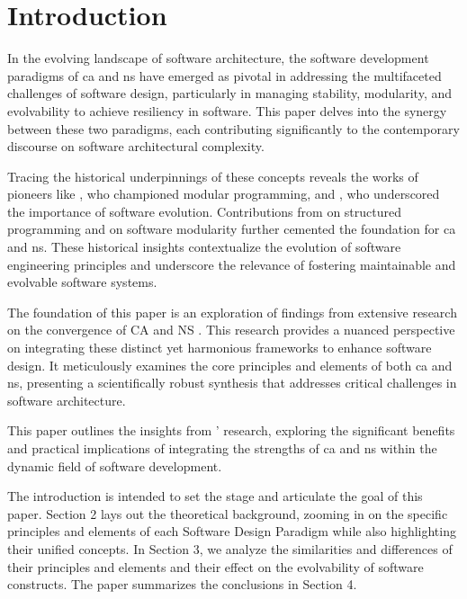 \section{Introduction} \label{sec:introduction} In the evolving landscape of software
architecture, the software development paradigms of \gls{ca} and \gls{ns} have emerged as
pivotal in addressing the multifaceted challenges of software design, particularly in
managing stability, modularity, and evolvability to achieve resiliency in software. This
paper delves into the synergy between these two paradigms, each contributing significantly
to the contemporary discourse on software architectural complexity.

Tracing the historical underpinnings of these concepts reveals the works of pioneers like
\textcite{d_mcilroy_nato_1968}, who championed modular programming, and
\textcite{lehman_programs_1980}, who underscored the importance of software evolution.
Contributions from \textcite{dijkstra_letters_1968} on structured programming and
\textcite{parnas_criteria_1972} on software modularity further cemented the foundation for
\gls{ca} and \gls{ns}. These historical insights contextualize the evolution of software
engineering principles and underscore the relevance of fostering maintainable and
evolvable software systems.

The foundation of this paper is an exploration of findings from extensive research on
the convergence of CA and NS \cite{koks_convergence_2023}. This research provides a
nuanced perspective on integrating these distinct yet harmonious frameworks to enhance
software design. It meticulously examines the core principles and elements of both
\gls{ca} and \gls{ns}, presenting a scientifically robust synthesis that addresses
critical challenges in software architecture.

This paper outlines the insights from ' research,
exploring the significant benefits and practical implications of integrating the strengths
of \gls{ca} and \gls{ns} within the dynamic field of software development.

The introduction is intended to set the stage and articulate the goal of this paper.
Section 2 lays out the theoretical background, zooming in on the specific principles and
elements of each Software Design Paradigm while also highlighting their unified concepts.
In Section 3, we analyze the similarities and differences of their principles and elements
and their effect on the evolvability of software constructs. The paper summarizes the
conclusions in Section 4.